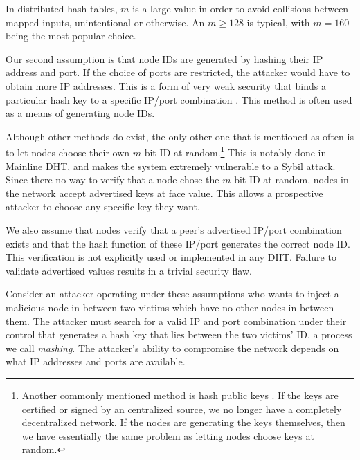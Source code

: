 \documentclass[11pt,conference]{IEEEtran}
\begin{document}
In distributed hash tables, $m$ is a large value in order to avoid collisions between mapped inputs, unintentional or otherwise. 
An $m \geq 128$ is typical, with $m = 160$ being the most popular choice.

Our second assumption is that node IDs are generated by hashing their IP address and port.
If the choice of ports are restricted, the attacker would have to obtain more IP addresses.
This is a form of very weak security that binds a particular hash key to a specific IP/port combination \cite{dinger2006defending} \cite{sit2002security}.
This method is often used as a means of generating node IDs.


Although other methods do exist, the only other one that is mentioned as often is to let nodes choose their own $m$-bit ID at random.\footnote{Another commonly mentioned method is hash public keys  \cite{dhtsec} \cite{sit2002security} \cite{pastry} \cite{castro2002secure}.  If the keys are certified or signed by an centralized source, we no longer have a completely decentralized network.  If the nodes are generating the keys themselves, then we have essentially the same problem as letting nodes choose keys at random.}
This is notably done in Mainline DHT, and makes the system extremely vulnerable to a Sybil attack.
Since there no way to verify that a node chose the $m$-bit ID at random, nodes in the network accept advertised keys at face value.
This allows a prospective attacker to choose any specific key they want.

We also assume that nodes verify that a peer's advertised IP/port combination exists and that the hash function of these IP/port generates the correct node ID.
This verification is not explicitly used or implemented in any DHT. 
Failure to validate advertised values results in a trivial security flaw.



Consider an attacker operating under these assumptions who wants to inject a malicious node in between two victims which have no other nodes in between them.
The attacker must search for a valid IP and port combination under their control that generates a hash key that lies between the two victims' ID, a process we call \textit{mashing}.
The attacker's ability to compromise the network depends on what IP addresses and ports are available.
\end{document}
